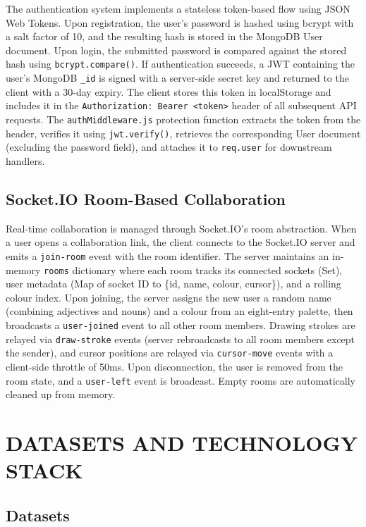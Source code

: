 \documentclass[12pt,a4paper]{report}
\begin{document}
The authentication system implements a stateless token-based flow using JSON Web Tokens. Upon registration, the user's password is hashed using bcrypt with a salt factor of 10, and the resulting hash is stored in the MongoDB User document. Upon login, the submitted password is compared against the stored hash using \texttt{bcrypt.compare()}. If authentication succeeds, a JWT containing the user's MongoDB \texttt{\_id} is signed with a server-side secret key and returned to the client with a 30-day expiry. The client stores this token in localStorage and includes it in the \texttt{Authorization: Bearer <token>} header of all subsequent API requests. The \texttt{authMiddleware.js} protection function extracts the token from the header, verifies it using \texttt{jwt.verify()}, retrieves the corresponding User document (excluding the password field), and attaches it to \texttt{req.user} for downstream handlers.

\subsection{Socket.IO Room-Based Collaboration}

Real-time collaboration is managed through Socket.IO's room abstraction. When a user opens a collaboration link, the client connects to the Socket.IO server and emits a \texttt{join-room} event with the room identifier. The server maintains an in-memory \texttt{rooms} dictionary where each room tracks its connected sockets (Set), user metadata (Map of socket ID to \{id, name, colour, cursor\}), and a rolling colour index. Upon joining, the server assigns the new user a random name (combining adjectives and nouns) and a colour from an eight-entry palette, then broadcasts a \texttt{user-joined} event to all other room members. Drawing strokes are relayed via \texttt{draw-stroke} events (server rebroadcasts to all room members except the sender), and cursor positions are relayed via \texttt{cursor-move} events with a client-side throttle of 50ms. Upon disconnection, the user is removed from the room state, and a \texttt{user-left} event is broadcast. Empty rooms are automatically cleaned up from memory.

\section{DATASETS AND TECHNOLOGY STACK}

\subsection{Datasets}
\end{document}
